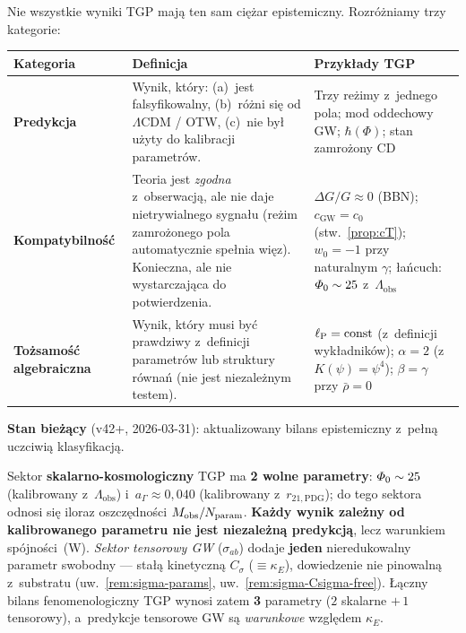 \begin{remark}\label{rem:honest-classification}
Nie wszystkie wyniki TGP maj\k{a} ten sam ci\k{e}\.zar
epistemiczny. Rozr\'o\.zniamy trzy kategorie:

\medskip
\begin{center}\small
\begin{tabular}{@{}lp{7.5cm}p{3.5cm}@{}}
\toprule
\textbf{Kategoria} & \textbf{Definicja} & \textbf{Przyk\l{}ady TGP} \\
\midrule
\textbf{Predykcja} &
  Wynik, kt\'ory: (a)~jest falsyfikowalny, (b)~r\'o\.zni si\k{e}
  od $\Lambda$CDM / OTW, (c)~nie by\l{} u\.zyty
  do kalibracji parametr\'ow.
& Trzy re\.zimy z~jednego pola; mod oddechowy GW;
  $\hbar(\Phi)$; stan zamro\.zony CD \\[4pt]
\textbf{Kompatybilno\'s\'c} &
  Teoria jest \emph{zgodna} z~obserwacj\k{a}, ale nie
  daje nietrywialnego sygna\l{}u (re\.zim zamro\.zonego
  pola automatycznie spe\l{}nia wi\k{e}z). Konieczna,
  ale nie wystarczaj\k{a}ca do potwierdzenia.
& $\Delta G/G \approx 0$ (BBN); $c_{\mathrm{GW}} = c_0$ (stw.~\ref{prop:cT});
  $w_0 = -1$ przy naturalnym $\gamma$;
  \l{}a\'ncuch: $\varPhi_0 \sim 25$ z~$\Lambda_{\mathrm{obs}}$ \\[4pt]
\textbf{To\.zsamo\'s\'c algebraiczna} &
  Wynik, kt\'ory musi by\'c prawdziwy z~definicji
  parametr\'ow lub struktury r\'owna\'n (nie jest
  niezale\.znym testem).
& $\ell_{\mathrm{P}} = \mathrm{const}$ (z~definicji wyk\l{}adnik\'ow);
  $\alpha = 2$ (z~$K(\psi)=\psi^4$);
  $\beta = \gamma$ przy $\bar\rho = 0$ \\
\bottomrule
\end{tabular}
\end{center}

\medskip\noindent
\textbf{Stan bie\.z\k{a}cy} (v42+, 2026-03-31): aktualizowany bilans
epistemiczny z~pe\l{}n\k{a} uczciwi\k{a} klasyfikacj\k{a}.

Sektor \textbf{skalarno-kosmologiczny} TGP ma \textbf{2 wolne parametry}:
$\varPhi_0 \sim 25$ (kalibrowany z~$\Lambda_{\mathrm{obs}}$) i~$a_\Gamma \approx 0{,}040$
(kalibrowany z~$r_{21,\mathrm{PDG}}$); do tego sektora odnosi si\k{e} iloraz
oszcz\k{e}dno\'sci $M_{\rm obs}/N_{\rm param}$.
\textbf{Ka\.zdy wynik zale\.zny od kalibrowanego parametru
nie jest niezale\.zn\k{a} predykcj\k{a}}, lecz warunkiem
sp\'ojno\'sci~(W).
\emph{Sektor tensorowy GW} ($\sigma_{ab}$) dodaje \textbf{jeden} nieredukowalny
parametr swobodny --- sta\l{}\k{a} kinetyczn\k{a} $C_\sigma$ ($\equiv\kappa_E$),
dowiedzenie nie pinowaln\k{a} z~substratu (uw.~\ref{rem:sigma-params},
uw.~\ref{rem:sigma-Csigma-free}). \L{}\k{a}czny bilans fenomenologiczny TGP wynosi
zatem \textbf{3} parametry ($2$ skalarne $+\,1$ tensorowy), a~predykcje tensorowe
GW s\k{a} \emph{warunkowe} wzgl\k{e}dem $\kappa_E$.


\end{remark}
